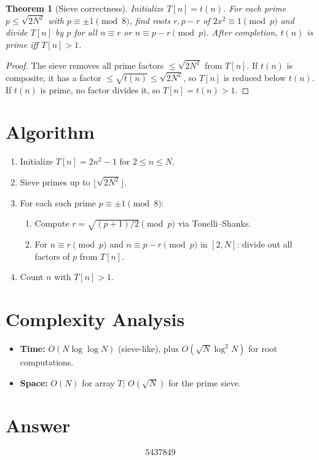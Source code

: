 \documentclass[12pt]{article}
\newtheorem{theorem}{Theorem}
\begin{document}
\begin{theorem}[Sieve correctness]
Initialize $T[n] = t(n)$. For each prime $p \leq \sqrt{2N^2}$ with $p \equiv \pm 1\pmod{8}$, find roots $r, p-r$ of $2x^2\equiv 1\pmod{p}$ and divide $T[n]$ by $p$ for all $n \equiv r$ or $n \equiv p-r\pmod{p}$. After completion, $t(n)$ is prime iff $T[n] > 1$.
\end{theorem}

\begin{proof}
The sieve removes all prime factors $\leq \sqrt{2N^2}$ from $T[n]$. If $t(n)$ is composite, it has a factor $\leq \sqrt{t(n)} \leq \sqrt{2N^2}$, so $T[n]$ is reduced below $t(n)$. If $t(n)$ is prime, no factor divides it, so $T[n] = t(n) > 1$.
\end{proof}

\section{Algorithm}

\begin{enumerate}
\item Initialize $T[n] = 2n^2-1$ for $2 \leq n \leq N$.
\item Sieve primes up to $\lfloor\sqrt{2N^2}\rfloor$.
\item For each such prime $p \equiv \pm 1\pmod{8}$:
  \begin{enumerate}
  \item Compute $r = \sqrt{(p+1)/2}\pmod{p}$ via Tonelli--Shanks.
  \item For $n \equiv r\pmod{p}$ and $n \equiv p-r\pmod{p}$ in $[2, N]$: divide out all factors of $p$ from $T[n]$.
  \end{enumerate}
\item Count $n$ with $T[n] > 1$.
\end{enumerate}

\section{Complexity Analysis}

\begin{itemize}
\item \textbf{Time:} $O(N\log\log N)$ (sieve-like), plus $O(\sqrt{N}\log^2 N)$ for root computations.
\item \textbf{Space:} $O(N)$ for array $T$; $O(\sqrt{N})$ for the prime sieve.
\end{itemize}

\section{Answer}

\[
\boxed{5437849}
\]
\end{document}
